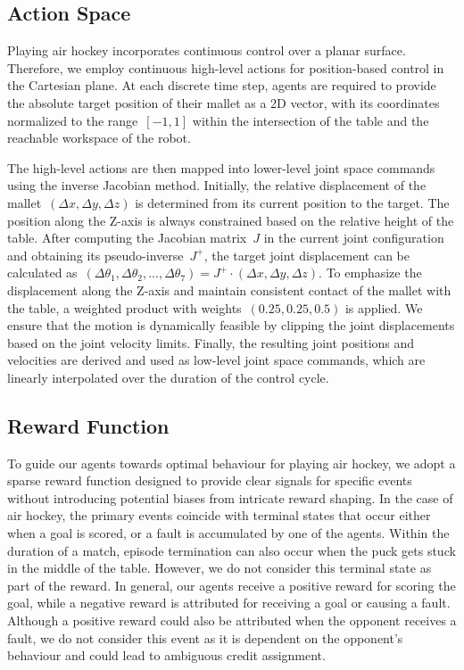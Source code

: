 \documentclass{article}
\begin{document}
\subsection{Action Space}\label{ssec:action-space}

Playing air hockey incorporates continuous control over a planar surface. Therefore, we employ continuous high-level actions for position-based control in the Cartesian plane. At each discrete time step, agents are required to provide the absolute target position of their mallet as a 2D vector, with its coordinates normalized to the range~\([-1, 1]\) within the intersection of the table and the reachable workspace of the robot.

The high-level actions are then mapped into lower-level joint space commands using the inverse Jacobian method. Initially, the relative displacement of the mallet~\((\Delta x, \Delta y, \Delta z)\) is determined from its current position to the target. The position along the Z-axis is always constrained based on the relative height of the table. After computing the Jacobian matrix~\(J\) in the current joint configuration and obtaining its pseudo-inverse~\(J^+\), the target joint displacement can be calculated as~\((\Delta \theta_1, \Delta \theta_2, ..., \Delta \theta_7) = J^+ \cdot (\Delta x, \Delta y, \Delta z)\). To emphasize the displacement along the Z-axis and maintain consistent contact of the mallet with the table, a weighted product with weights~\((0.25, 0.25, 0.5)\) is applied. We ensure that the motion is dynamically feasible by clipping the joint displacements based on the joint velocity limits. Finally, the resulting joint positions and velocities are derived and used as low-level joint space commands, which are linearly interpolated over the duration of the control cycle.

\subsection{Reward Function}\label{ssec:reward-function}

To guide our agents towards optimal behaviour for playing air hockey, we adopt a sparse reward function designed to provide clear signals for specific events without introducing potential biases from intricate reward shaping. In the case of air hockey, the primary events coincide with terminal states that occur either when a goal is scored, or a fault is accumulated by one of the agents. Within the duration of a match, episode termination can also occur when the puck gets stuck in the middle of the table. However, we do not consider this terminal state as part of the reward. In general, our agents receive a positive reward for scoring the goal, while a negative reward is attributed for receiving a goal or causing a fault. Although a positive reward could also be attributed when the opponent receives a fault, we do not consider this event as it is dependent on the opponent's behaviour and could lead to ambiguous credit assignment.
\end{document}
